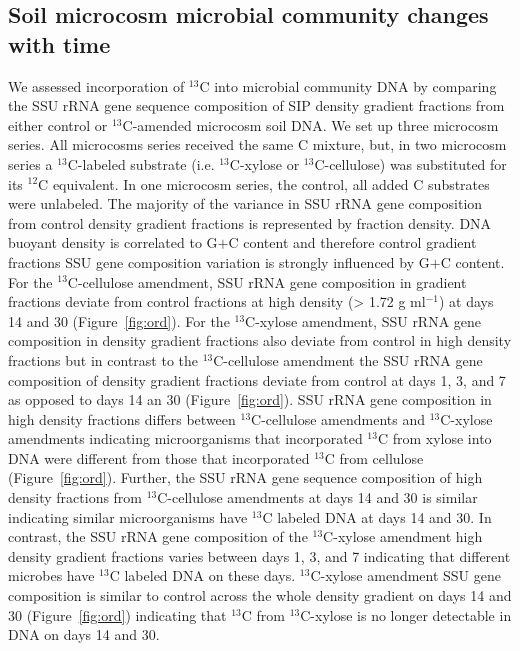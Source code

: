 \subsection{Soil microcosm microbial community changes with time}
We assessed incorporation of $^{13}$C into microbial community DNA by comparing the
SSU rRNA gene sequence composition of SIP density gradient fractions from
either control or $^{13}$C-amended microcosm soil DNA. We set up three microcosm
series. All microcosms series received the same C mixture, but, in two
microcosm series a $^{13}$C-labeled substrate (i.e. $^{13}$C-xylose or
$^{13}$C-cellulose) was substituted for its $^{12}$C equivalent. In one
microcosm series, the control, all added C substrates were unlabeled. The
majority of the variance in SSU rRNA gene composition from control density
gradient fractions is represented by fraction density. DNA buoyant density is
correlated to G$+$C content \citep{Buckley_2007} and therefore control gradient
fractions SSU gene composition variation is strongly influenced by G$+$C
content. For the $^{13}$C-cellulose amendment, SSU rRNA gene composition in
gradient fractions deviate from control fractions at high density (> 1.72
g ml$^{-1}$) at days 14 and 30 (Figure~\ref{fig:ord}). For the $^{13}$C-xylose amendment,
SSU rRNA gene composition in density gradient fractions also deviate from
control in high density fractions but in contrast to the $^{13}$C-cellulose
amendment the SSU rRNA gene composition of density gradient fractions deviate
from control at days 1, 3, and 7 as opposed to days 14 an 30 (Figure~\ref{fig:ord}). SSU
rRNA gene composition in high density fractions differs between
$^{13}$C-cellulose amendments and $^{13}$C-xylose amendments indicating
microorganisms that incorporated $^{13}$C from xylose into DNA were different
from those that incorporated $^{13}$C from cellulose (Figure~\ref{fig:ord}). Further, the
SSU rRNA gene sequence composition of high density fractions from
$^{13}$C-cellulose amendments at days 14 and 30 is similar indicating similar
microorganisms have $^{13}$C labeled DNA at days 14 and 30. In contrast, the
SSU rRNA gene composition of the $^{13}$C-xylose amendment high density
gradient fractions varies between days 1, 3, and 7 indicating that different
microbes have $^{13}$C labeled DNA on these days. $^{13}$C-xylose amendment SSU
gene composition is similar to control across the whole density gradient on
days 14 and 30 (Figure~\ref{fig:ord}) indicating that $^{13}$C from $^{13}$C-xylose is no
longer detectable in DNA on days 14 and 30. 

